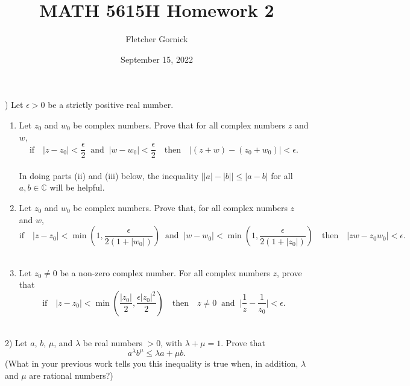 \documentclass[11pt]{article}
\title{\vspace{-1.0cm}MATH 5615H Homework 2}
\author{Fletcher Gornick}
\date{September 15, 2022}
\begin{document}
 ) Let \(\epsilon > 0\) be a strictly positive real number. \\
  \begin{enumerate}[label=(\roman*)]
    \item Let \(z_0\) and \(w_0\) be complex numbers.  Prove that for all complex numbers \(z\) and \(w\),
      \[
        \text{if} \quad |z - z_0| < \frac{\epsilon}{2} \;\; 
        \text{and} \;\; |w - w_0| < \frac{\epsilon}{2} \quad 
        \text{then} \quad |(z + w) - (z_0 + w_0)| < \epsilon.
      \] \\

      In doing parts (ii) and (iii) below, the inequality \(\big||a| - |b|\big| \leq |a - b|\) for all \(a, b \in \mathbb{C}\)
      will be helpful.

    \item Let \(z_0\) and \(w_0\) be complex numbers.  Prove that, for all complex numbers \(z\) and \(w\),
      \[
        \text{if} \quad |z - z_0| < \min\left(1, \frac{\epsilon}{2(1 + |w_0|)}\right) \;\;
        \text{and} \;\; |w - w_0| < \min\left(1, \frac{\epsilon}{2(1 + |z_0|)}\right) \quad
        \text{then} \quad |zw - z_0w_0| < \epsilon.
      \] \\

    \item Let \(z_0 \neq 0\) be a non-zero complex number.  For all complex numbers \(z\), prove that
      \[
        \text{if} \quad |z - z_0| < \min\left(\frac{|z_0|}{2}, \frac{\epsilon|z_0|^2}{2}\right) \quad
        \text{then} \quad z \neq 0 \;\; \text{and} \;\; \Big|\frac{1}{z} - \frac{1}{z_0}\Big| < \epsilon.
      \] \\
  \end{enumerate}
  \newpage

  2) Let \(a\), \(b\), \(\mu\), and \(\lambda\) be real numbers \(> 0\), with \(\lambda + \mu = 1\).  Prove that
  \[a^\lambda b^\mu \leq \lambda a + \mu b.\]
  (What in your previous work tells you this inequality is true when, in addition, \(\lambda\) and \(\mu\) are rational 
  numbers?)
\end{document}
